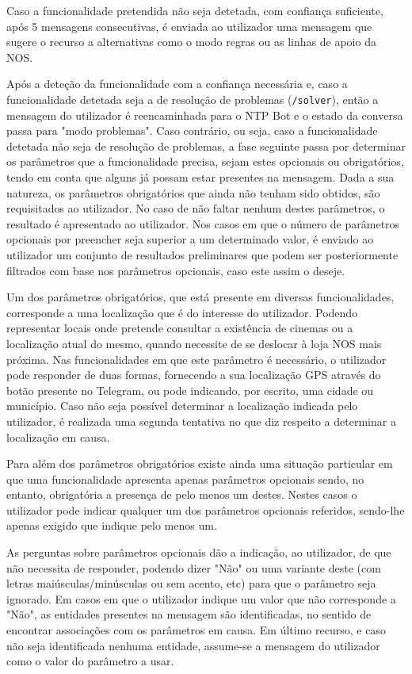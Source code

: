 \documentclass[11pt,a4paper]{article}
\begin{document}
Caso a funcionalidade pretendida não seja detetada, com confiança suficiente, após 5 mensagens consecutivas,
é enviada ao utilizador uma mensagem que sugere o recurso a alternativas como o modo regras ou as linhas de
apoio da NOS.

Após a deteção da funcionalidade com a confiança necessária e, caso a funcionalidade detetada seja a de
resolução de problemas (\texttt{/solver}), então a mensagem do utilizador é reencaminhada para o NTP Bot e o
estado da conversa passa para "modo problemas".  Caso contrário, ou seja, caso a funcionalidade detetada não
seja de resolução de problemas, a fase seguinte passa por determinar os parâmetros que a funcionalidade
precisa, sejam estes opcionais ou obrigatórios, tendo em conta que alguns já possam estar presentes na
mensagem. Dada a sua natureza, os parâmetros obrigatórios que ainda não tenham sido obtidos, são
requisitados ao utilizador. No caso de não faltar nenhum destes parâmetros, o resultado é apresentado ao
utilizador. Nos casos em que o número de parâmetros opcionais por preencher seja superior a um determinado
valor, é enviado ao utilizador um conjunto de resultados preliminares que podem ser posteriormente filtrados
com base nos parâmetros opcionais, caso este assim o deseje.

Um dos parâmetros obrigatórios, que está presente em diversas funcionalidades, corresponde a uma localização
que é do interesse do utilizador. Podendo representar locais onde pretende consultar a existência de cinemas
ou a localização atual do mesmo, quando necessite de se deslocar à loja NOS mais próxima. Nas
funcionalidades em que este parâmetro é necessário, o utilizador pode responder de duas formas, fornecendo a
sua localização GPS através do botão presente no Telegram, ou pode indicando, por escrito, uma cidade ou
município. Caso não seja possível determinar a localização indicada pelo utilizador, é realizada uma
segunda tentativa no que diz respeito a determinar a localização em causa.

Para além dos parâmetros obrigatórios existe ainda uma situação particular em que uma funcionalidade
apresenta apenas parâmetros opcionais sendo, no entanto, obrigatória a presença de pelo menos um destes.
Nestes casos o utilizador pode indicar qualquer um dos parâmetros opcionais referidos, sendo-lhe apenas
exigido que indique pelo menos um.

As perguntas sobre parâmetros opcionais dão a indicação, ao utilizador, de que não necessita de responder,
podendo dizer "Não" ou uma variante deste (com letras maiúsculas/minúsculas ou sem acento, etc) para que o
parâmetro seja ignorado. Em casos em que o utilizador indique um valor que não corresponde a "Não", as
entidades presentes na mensagem são identificadas, no sentido de encontrar associações com os parâmetros em
causa. Em último recurso, e caso não seja identificada nenhuma entidade, assume-se a mensagem do utilizador
como o valor do parâmetro a usar.
\end{document}
